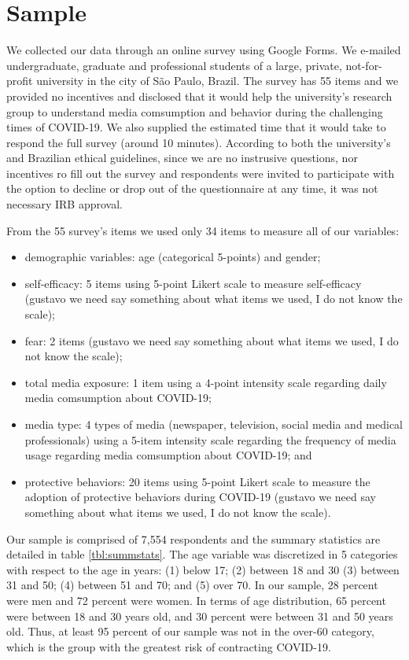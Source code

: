 \documentclass{article}
\begin{document}
\section{Sample}
\label{sec:sample}

We collected our data through an online survey using Google Forms.
We e-mailed undergraduate, graduate and professional students of a large, private, not-for-profit university in the city of São Paulo, Brazil.
The survey has 55 items and we provided no incentives and disclosed that it would help the university's research group to understand media comsumption and behavior during the challenging times of COVID-19.
We also supplied the estimated time that it would take to respond the full survey (around 10 minutes).
According to both the university's and Brazilian ethical guidelines, since we are no instrusive questions, nor incentives ro fill out the survey and respondents were invited to participate with the option to decline or drop out of the questionnaire at any time, it was not necessary IRB approval.

From the 55 survey's items we used only 34 items to measure all of our variables:

\begin{itemize}
	\item demographic variables: age (categorical 5-points) and gender;
	\item self-efficacy: 5 items using 5-point Likert scale to measure self-efficacy (gustavo we need say something about what items we used, I do not know the scale);
	\item fear: 2 items (gustavo we need say something about what items we used, I do not know the scale);
	\item total media exposure: 1 item using a 4-point intensity scale regarding daily media comsumption about COVID-19;
	\item media type: 4 types of media (newspaper, television, social media and medical professionals) using a 5-item intensity scale regarding the frequency of media usage regarding media comsumption about COVID-19; and
	\item protective behaviors: 20 items using 5-point Likert scale to measure the adoption of protective behaviors during COVID-19 (gustavo we need say something about what items we used, I do not know the scale).
\end{itemize}

Our sample is comprised of 7,554 respondents and the summary statistics are detailed in table \ref{tbl:summstats}.
The age variable was discretized in 5 categories with respect to the age in years: (1) below 17; (2) between 18 and 30 (3) between 31 and 50; (4) between 51 and 70; and (5) over 70.
In our sample, 28 percent were men and 72 percent were women.
In terms of age distribution, 65 percent were between 18 and 30 years old, and 30 percent were between 31 and 50 years old. Thus, at least 95 percent of our sample was not in the over-60 category, which is the group with the greatest risk of contracting COVID-19.
\end{document}
